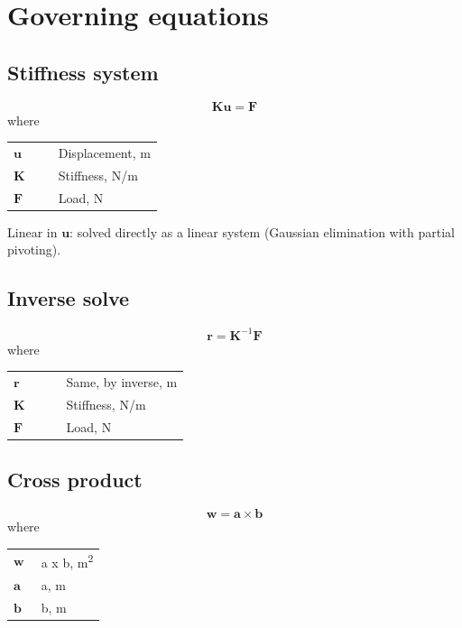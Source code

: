 \documentclass[11pt,a4paper]{article}
\begin{document}
\section{Governing equations}

\subsection{Stiffness system}
\begin{equation}
  \mathbf{K}\mathbf{u} = \mathbf{F}
  \label{eq:stiffness-system}
\end{equation}
\noindent where

\noindent\begin{tabular}{@{\quad}l@{\quad}p{0.7\linewidth}@{}}
  $\mathbf{u}$ & Displacement, \si{m} \\
  $\mathbf{K}$ & Stiffness, \si{N/m} \\
  $\mathbf{F}$ & Load, \si{N} \\
\end{tabular}

\noindent Linear in $\mathbf{u}$: solved directly as a linear system (Gaussian elimination with partial pivoting).

\subsection{Inverse solve}
\begin{equation}
  \mathbf{r} = \mathbf{K}^{-1}\mathbf{F}
  \label{eq:inverse-solve}
\end{equation}
\noindent where

\noindent\begin{tabular}{@{\quad}l@{\quad}p{0.7\linewidth}@{}}
  $\mathbf{r}$ & Same, by inverse, \si{m} \\
  $\mathbf{K}$ & Stiffness, \si{N/m} \\
  $\mathbf{F}$ & Load, \si{N} \\
\end{tabular}


\subsection{Cross product}
\begin{equation}
  \mathbf{w} = \mathbf{a} \times \mathbf{b}
  \label{eq:cross-product}
\end{equation}
\noindent where

\noindent\begin{tabular}{@{\quad}l@{\quad}p{0.7\linewidth}@{}}
  $\mathbf{w}$ & a x b, \si{m^{2}} \\
  $\mathbf{a}$ & a, \si{m} \\
  $\mathbf{b}$ & b, \si{m} \\
\end{tabular}
\end{document}
